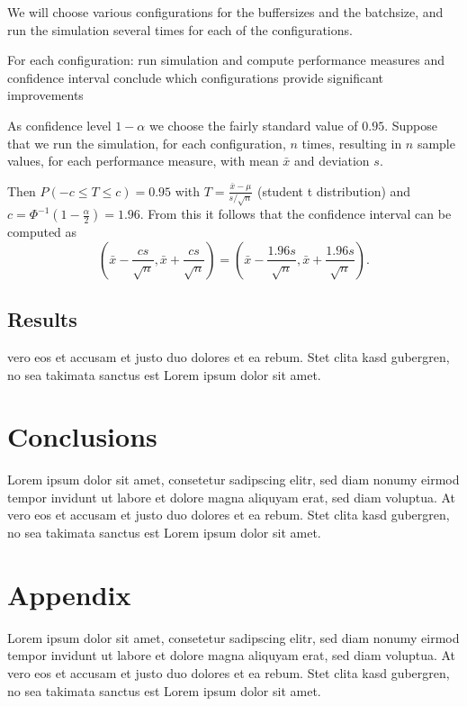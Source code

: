 \documentclass{article}
\begin{document}
We will choose various configurations for the buffersizes and the batchsize, and run the simulation several times for each of the configurations.

For each configuration:
    run simulation and compute performance measures and confidence interval
    conclude which configurations provide significant improvements


As confidence level $1 - \alpha$ we choose the fairly standard value of $0.95$.
Suppose that we run the simulation, for each configuration, $n$ times, resulting in $n$ sample values, for each performance measure, with mean $\bar{x}$ and deviation $s$.

Then $P(-c \leq T \leq c) = 0.95 $ with $T = \frac{\bar{x} - \mu}{s/\sqrt{n}}$ (student t distribution) and $c = \Phi ^{-1} (1 - \frac{\alpha}{2})= 1.96$.
From this it follows that the confidence interval can be computed as
\[ (\bar{x} - \frac{cs}{\sqrt{n}}, \bar{x} + \frac{cs}{\sqrt{n}}) =
(\bar{x} - \frac{1.96s}{\sqrt{n}}, \bar{x} + \frac{1.96s}{\sqrt{n}}). \]


\subsection{Results}
vero eos et accusam et justo duo dolores et ea rebum. Stet clita kasd gubergren,
no sea takimata sanctus est Lorem ipsum dolor sit amet.


\section{Conclusions}
Lorem ipsum dolor sit amet, consetetur sadipscing elitr, sed diam nonumy eirmod
tempor invidunt ut labore et dolore magna aliquyam erat, sed diam voluptua. At
vero eos et accusam et justo duo dolores et ea rebum. Stet clita kasd gubergren,
no sea takimata sanctus est Lorem ipsum dolor sit amet.


\section{Appendix}
Lorem ipsum dolor sit amet, consetetur sadipscing elitr, sed diam nonumy eirmod
tempor invidunt ut labore et dolore magna aliquyam erat, sed diam voluptua. At
vero eos et accusam et justo duo dolores et ea rebum. Stet clita kasd gubergren,
no sea takimata sanctus est Lorem ipsum dolor sit amet.
\end{document}

